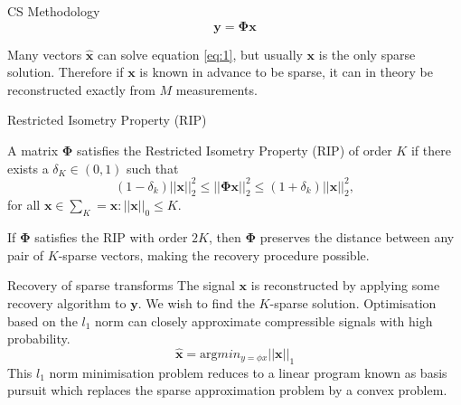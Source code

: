 \documentclass[final]{beamer}
\begin{document}
\begin{frame}{}
\begin{columns}[t]
\begin{column}{0.24\textwidth}
\begin{block}{CS Methodology}
\begin{equation}
  \label{eq:1}
\pmb{y} =\pmb{\Phi x}
\end{equation}


Many vectors $\pmb{\hat{x}}$ can solve equation \eqref{eq:1}, but usually $\pmb{x}$ is the only sparse solution. Therefore if $\pmb{x}$ is known in advance to be sparse, it can in theory be reconstructed exactly from $M$ measurements.
\end{block}
   \vspace{10pt}
\begin{block}{Restricted Isometry Property (RIP)}

  A matrix $\pmb{\Phi}$ satisfies the Restricted Isometry Property (RIP) of order $K$ if there exists a $\delta_K  \in (0,1)$ such that 
\begin{equation}
  \label{eq:4}
  (1 - \delta_k)||\pmb{x}||^2_2 \leq||\pmb{\Phi} \pmb{x}||^2_2 \leq (1 + \delta_k)||\pmb{x}||^2_2,
\end{equation}
for all $\pmb{x} \in \sum_K = {\pmb{x}:||\pmb{x}||_0 \leq K} $.
 
If $\pmb{\Phi}$ satisfies the RIP with order $2K$, then $\pmb{\Phi}$ preserves the distance between any pair of $K$-sparse vectors, making the recovery procedure possible.
\end{block}

      \vspace{10pt}
      

      \begin{block}{Recovery of sparse transforms}
The signal $\pmb{x}$ is reconstructed by applying some recovery algorithm to $\pmb{y}$. We wish to find the $K$-sparse solution. Optimisation based on the $l_1$ norm can closely approximate compressible signals with high probability.
%
\begin{equation}
  \label{eq:3}
  \pmb{\hat{x}} = \text{arg} min_{y = \phi x} ||\pmb{x}||_1
\end{equation}
%
This $l_1$ norm minimisation problem reduces to a linear program known as basis pursuit which replaces the sparse approximation problem by a convex problem.

\vspace{100pt}




\end{block}
\end{column}
\end{columns}
\end{frame}
\end{document}
